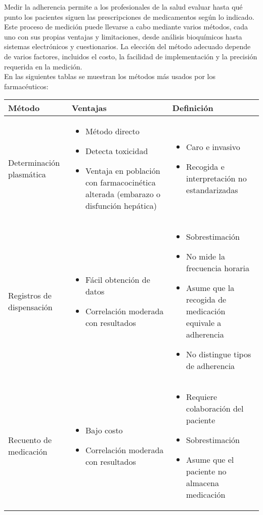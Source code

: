 Medir la adherencia permite a los profesionales de la salud evaluar hasta qué punto los pacientes siguen las prescripciones de medicamentos según lo indicado. Este proceso de medición puede llevarse a cabo mediante varios métodos, cada uno con sus propias ventajas y limitaciones, desde análisis bioquímicos hasta sistemas electrónicos y cuestionarios. La elección del método adecuado depende de varios factores, incluidos el costo, la facilidad de implementación y la precisión requerida en la medición. \cite{ibarra2017adherencia}\\

En las siguientes tablas se muestran los métodos más usados por los farmacéuticos:

\begin{table}[ht]
	\centering
	\label{my-label}
	\begin{tabular}{|p{4cm}|p{5.5cm}|p{5.5cm}|}
		\hline
		\textbf{Método} & \textbf{Ventajas} & \textbf{Definición} \\ \hline
		Determinación plasmática & 
		\begin{itemize}
			\item Método directo
			\item Detecta toxicidad
			\item Ventaja en población con farmacocinética alterada (embarazo o disfunción hepática)
		\end{itemize} & 
		\begin{itemize}
			\item Caro e invasivo
			\item Recogida e interpretación no estandarizadas
		\end{itemize} \\ \hline
		Registros de dispensación & 
		\begin{itemize}
			\item Fácil obtención de datos
			\item Correlación moderada con resultados
		\end{itemize} & 
		\begin{itemize}
			\item Sobrestimación
			\item No mide la frecuencia horaria
			\item Asume que la recogida de medicación equivale a adherencia
			\item No distingue tipos de adherencia
		\end{itemize} \\ \hline
		Recuento de medicación & 
		\begin{itemize}
			\item Bajo costo
			\item Correlación moderada con resultados
		\end{itemize} & 
		\begin{itemize}
			\item Requiere colaboración del paciente
			\item Sobrestimación
			\item Asume que el paciente no almacena medicación
		\end{itemize} \\ \hline
	\end{tabular}


\end{table}
